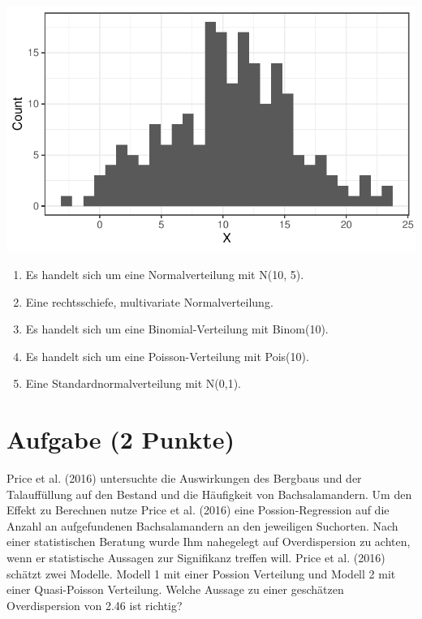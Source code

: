 \documentclass[a4paper, 10pt]{scrartcl}\usepackage[]{graphicx}\usepackage[]{xcolor}
\makeatletter
\def\maxwidth{ %
  \ifdim\Gin@nat@width>\linewidth
    \linewidth
  \else
    \Gin@nat@width
  \fi
}
\makeatother
\begin{document}
{\centering \includegraphics[width=\maxwidth]{img/mc-distribution-02-a-1} 

}







\begin{enumerate}
\item [\textbf{A} \msquare] Es handelt sich um eine Normalverteilung mit N(10, 5).
\item [\textbf{B} \msquare] Eine rechtsschiefe, multivariate Normalverteilung.
\item [\textbf{C} \msquare] Es handelt sich um eine Binomial-Verteilung mit Binom(10).
\item [\textbf{D} \msquare] Es handelt sich um eine Poisson-Verteilung mit Pois(10).
\item [\textbf{E} \msquare] Eine Standardnormalverteilung mit N(0,1).
\end{enumerate} 

\section{Aufgabe \hfill (2 Punkte)}




Price et al. (2016) untersuchte die Auswirkungen des Bergbaus und der
Talauff{\"u}llung auf den Bestand und die H{\"a}ufigkeit von Bachsalamandern. Um
den Effekt zu Berechnen nutze Price et al. (2016) eine Possion-Regression
auf die Anzahl an aufgefundenen Bachsalamandern an den jeweiligen
Suchorten. Nach einer statistischen Beratung wurde Ihm nahegelegt auf
Overdispersion zu achten, wenn er statistische Aussagen zur Signifikanz
treffen will. Price et al. (2016) sch{\"a}tzt zwei Modelle. Modell 1 mit einer
Possion Verteilung und Modell 2 mit einer Quasi-Poisson Verteilung. Welche
Aussage zu einer gesch{\"a}tzen Overdispersion von 2.46 ist
richtig?
\end{document}
